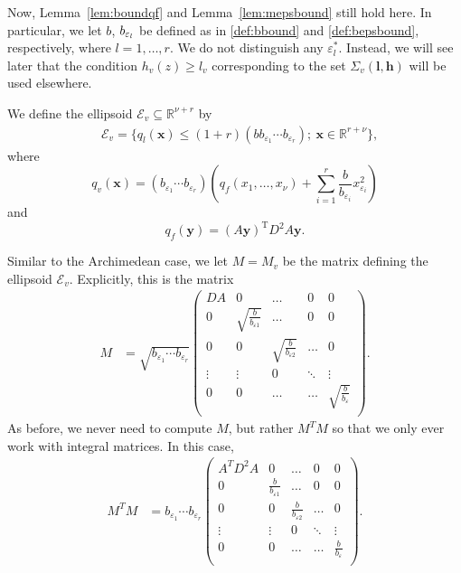 Now, Lemma~\ref{lem:boundqf} and Lemma~\ref{lem:mepsbound} still hold here. In particular, we let $b$, $b_{\varepsilon_l}$ be defined as in \eqref{def:bbound} and \eqref{def:bepsbound}, respectively, where $l = 1, \dots, r$. We do not distinguish any $\varepsilon_l^*$. Instead, we will see later that the condition $h_{v}(z) \geq l_{v}$ corresponding to the set $\Sigma_v(\mathbf{l}, \mathbf{h})$ will be used elsewhere. 

We define the ellipsoid $\mathcal{E}_v \subseteq \mathbb{R}^{\nu + r}$ by 
\begin{align}\label{def:ellp}
& \mathcal{E}_v=\{q_l(\mathbf{x})\leq (1 + r)(bb_{\varepsilon_1}\cdots b_{\varepsilon_r}); \ \mathbf{x}\in\mathbb{R}^{r+\nu}\},\end{align}
where
\[q_v(\mathbf{x})= (b_{\varepsilon_1}\cdots b_{\varepsilon_r})\left( q_f(x_1, \dots, x_{\nu}) + \sum_{i = 1}^r\frac{b}{b_{\varepsilon_i}}x_{\varepsilon_i}^2\right)\]
and
\[q_f(\mathbf{y}) = (A\mathbf{y})^{\text{T}}D^2A\mathbf{y}.\]

Similar to the Archimedean case, we let $M=M_v$ be the matrix defining the ellipsoid $\mathcal{E}_{v}$. Explicitly, this is the matrix
\begin{align*}
M &=\sqrt{b_{\varepsilon_1}\cdots b_{\varepsilon_r}}\begin{pmatrix}
	DA & 0 & \dots & 0 & 0\\
	0 & \sqrt{\frac{b}{b_{\varepsilon 1}}} & \dots & 0 & 0\\
	0 & 0  & \sqrt{\frac{b}{b_{\varepsilon 2}}} & \dots & 0\\
	\vdots & \vdots &0 &  \ddots & \vdots\\ 
	0 & 0 & \dots & \dots & \sqrt{\frac{b}{b_{\varepsilon}}} \\
	\end{pmatrix}.
\end{align*}	
As before, we never need to compute $M$, but rather $M^TM$ so that we only ever work with integral matrices. In this case, 
\begin{align*}
M^TM &= b_{\varepsilon_1}\cdots b_{\varepsilon_r}\begin{pmatrix}
	A^TD^2A & 0 & \dots & 0 & 0\\
	0 & \frac{b}{b_{\varepsilon 1}} & \dots & 0 & 0\\
	0 & 0  & \frac{b}{b_{\varepsilon 2}} & \dots & 0\\
	\vdots & \vdots &0 &  \ddots & \vdots\\ 
	0 & 0 & \dots & \dots & \frac{b}{b_{\varepsilon}} \\
	\end{pmatrix}.
\end{align*}	


